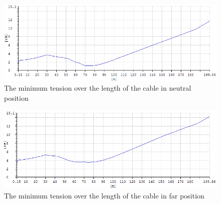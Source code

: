 \begin{figure}[H]
\centering
\includegraphics[scale=0.5]{figures/fminneu}
\caption{The minimum tension over the length of the cable in neutral position}
 \label{fig:fminneu}
\end{figure}


\begin{figure}[H]
\centering
\includegraphics[scale=0.5]{figures/fminfar}
\caption{The minimum tension over the length of the cable in far position}
 \label{fig:fminfar}
\end{figure}



